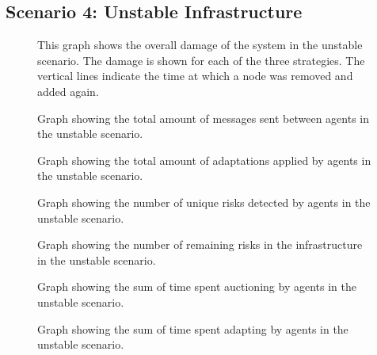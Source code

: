 \subsection{Scenario 4: Unstable Infrastructure}
\begin{figure}[H]
    \centering
    
    \caption{This graph shows the overall damage of the system in the unstable scenario. The damage is shown for each of the three strategies. The vertical lines indicate the time at which a node was removed and added again.}
    \label{fig:overall-damage-unstable}
\end{figure}

\begin{figure}[H]
    \centering
    
    \caption{Graph showing the total amount of messages sent between agents in the unstable scenario.}
    \label{fig:messages-unstable}
\end{figure}
\begin{figure}[H]
    \centering
    
    \caption{Graph showing the total amount of adaptations applied by agents in the unstable scenario.}
    \label{fig:proposals-unstable}
\end{figure}
\begin{figure}[H]
    \centering
        
    \caption{Graph showing the number of unique risks detected by agents in the unstable scenario.}
    \label{fig:risk-count-unstable}
\end{figure}
\begin{figure}[H]
    \centering
        
    \caption{Graph showing the number of remaining risks in the infrastructure in the unstable scenario.}
    \label{fig:risk-remaining-unstable}
\end{figure}
\begin{figure}[H]
    \centering
        
    \caption{Graph showing the sum of time spent auctioning by agents in the unstable scenario.}
    \label{fig:auctioning-time-unstable}
\end{figure}
\begin{figure}[H]
    \centering
        
    \caption{Graph showing the sum of time spent adapting by agents in the unstable scenario.}
    \label{fig:adapting-time-unstable}
\end{figure}
